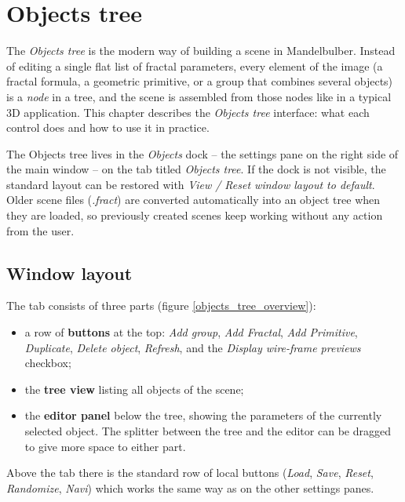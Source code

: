 \section{Objects tree}\label{objects-tree}

The \emph{Objects tree} is the modern way of building a scene in Mandelbulber. Instead of editing
a single flat list of fractal parameters, every element of the image (a fractal formula, a geometric
primitive, or a group that combines several objects) is a \emph{node} in a tree, and the scene is
assembled from those nodes like in a typical 3D application. This chapter describes the
\emph{Objects tree} interface: what each control does and how to use it in practice.

The Objects tree lives in the \emph{Objects} dock -- the settings pane on the right side of the
main window -- on the tab titled \emph{Objects tree}. If the dock is not visible, the standard
layout can be restored with \emph{View / Reset window layout to default}. Older scene files
(\emph{.fract}) are converted automatically into an object tree when they are loaded, so previously
created scenes keep working without any action from the user.

\subsection{Window layout}\label{objects-tree-layout}

The tab consists of three parts (figure \ref{objects_tree_overview}):

\begin{itemize}
	\item a row of \textbf{buttons} at the top: \emph{Add group}, \emph{Add Fractal},
	\emph{Add Primitive}, \emph{Duplicate}, \emph{Delete object}, \emph{Refresh}, and the
	\emph{Display wire-frame previews} checkbox;
	\item the \textbf{tree view} listing all objects of the scene;
	\item the \textbf{editor panel} below the tree, showing the parameters of the currently
	selected object. The splitter between the tree and the editor can be dragged to give more
	space to either part.
\end{itemize}

Above the tab there is the standard row of local buttons (\emph{Load}, \emph{Save}, \emph{Reset},
\emph{Randomize}, \emph{Navi}) which works the same way as on the other settings panes.

